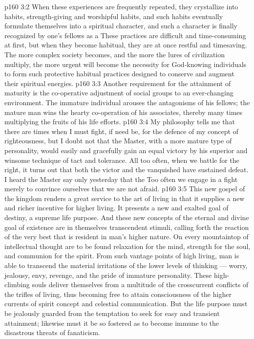 \vs p160 3:2 When these experiences are frequently repeated, they crystallize into habits, strength\hyp{}giving and worshipful habits, and such habits eventually formulate themselves into a spiritual character, and such a character is finally recognized by one’s fellows as a  These practices are difficult and time\hyp{}consuming at first, but when they become habitual, they are at once restful and timesaving. The more complex society becomes, and the more the lures of civilization multiply, the more urgent will become the necessity for God\hyp{}knowing individuals to form such protective habitual practices designed to conserve and augment their spiritual energies.
\vs p160 3:3 Another requirement for the attainment of maturity is the co\hyp{}operative adjustment of social groups to an ever\hyp{}changing environment. The immature individual arouses the antagonisms of his fellows; the mature man wins the hearty co\hyp{}operation of his associates, thereby many times multiplying the fruits of his life efforts.
\vs p160 3:4 My philosophy tells me that there are times when I must fight, if need be, for the defence of my concept of righteousness, but I doubt not that the Master, with a more mature type of personality, would easily and gracefully gain an equal victory by his superior and winsome technique of tact and tolerance. All too often, when we battle for the right, it turns out that both the victor and the vanquished have sustained defeat. I heard the Master say only yesterday that the  Too often we engage in a fight merely to convince ourselves that we are not afraid.
\vs p160 3:5 This new gospel of the kingdom renders a great service to the art of living in that it supplies a new and richer incentive for higher living. It presents a new and exalted goal of destiny, a supreme life purpose. And these new concepts of the eternal and divine goal of existence are in themselves transcendent stimuli, calling forth the reaction of the very best that is resident in man’s higher nature. On every mountaintop of intellectual thought are to be found relaxation for the mind, strength for the soul, and communion for the spirit. From such vantage points of high living, man is able to transcend the material irritations of the lower levels of thinking --- worry, jealousy, envy, revenge, and the pride of immature personality. These high\hyp{}climbing souls deliver themselves from a multitude of the crosscurrent conflicts of the trifles of living, thus becoming free to attain consciousness of the higher currents of spirit concept and celestial communication. But the life purpose must be jealously guarded from the temptation to seek for easy and transient attainment; likewise must it be so fostered as to become immune to the disastrous threats of fanaticism.
